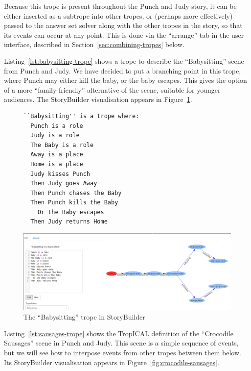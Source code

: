 \documentclass[11pt]{report}
\begin{document}
Because this trope is present throughout the Punch and Judy story, it can be
either inserted as a subtrope into other tropes, or (perhaps more effectively)
passed to the answer set solver along with the other tropes in the story, so
that its events can occur at any point. This is done via the ``arrange'' tab in
the user interface, described in Section~\ref{sec:combining-tropes} below.

Listing~\ref{lst:babysitting-trope} shows a trope to describe the
``Babysitting'' scene from Punch and Judy. We have decided to put a branching
point in this trope, where Punch may either kill the baby, or the baby escapes.
This gives the option of a more ``family-friendly'' alternative of the scene,
suitable for younger audiences. The StoryBuilder visualisation appears in Figure~\ref{fig:babysitting-trope}.

\begin{figure}[!t]
\begin{lstlisting}[label={lst:babysitting-trope},caption={The ``Babysitting'' trope}]
``Babysitting'' is a trope where:
  Punch is a role
  Judy is a role
  The Baby is a role
  Away is a place
  Home is a place
  Judy kisses Punch
  Then Judy goes Away
  Then Punch chases the Baby
  Then Punch kills the Baby
    Or the Baby escapes
  Then Judy returns Home
\end{lstlisting}

\smallskip
\centerline{\includegraphics[width=\textwidth]{babysitting-trope.png}}
\caption{The ``Babysitting'' trope in StoryBuilder}\label{fig:babysitting-trope}
\end{figure}

Listing~\ref{lst:sausages-trope} shows the TropICAL definition of the
``Crocodile Sausages'' scene in Punch and Judy. This scene is a simple sequence
of events, but we will see how to interpose events from other tropes between
them below. Its StoryBuilder visualisation appears in Figure~\ref{fig:crocodile-sausages}.
\end{document}
